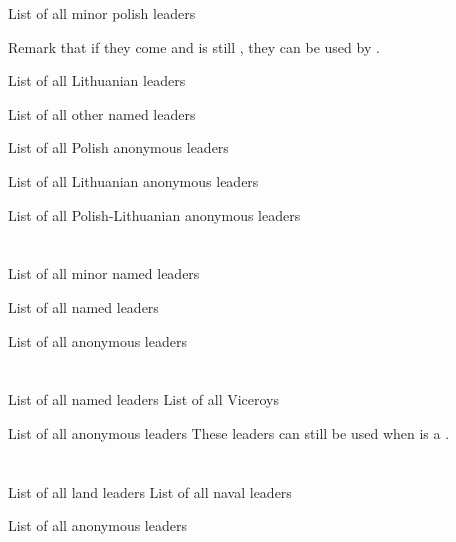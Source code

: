 \aparag List of all minor polish leaders 

\bparag Remark that if they come and \paysPologne is still \MAJ, they can be
used by \POL.

\aparag List of all Lithuanian leaders 

\aparag List of all other named leaders 

\aparag List of all Polish anonymous leaders \listanonymepologne

\aparag List of all Lithuanian anonymous leaders \listanonymelithuanie

\aparag List of all Polish-Lithuanian anonymous leaders \listanonymepollit




\section{\paysmajeurPrusse}

\aparag List of all minor named leaders 

\aparag List of all named leaders 

\aparag List of all anonymous leaders \listanonymeprusseM




\section{\paysmajeurPortugal}

\aparag List of all named leaders 
\aparag List of all Viceroys 

\aparag List of all anonymous leaders
\bparag These leaders can still be used when \paysPortugal is a \MIN.
\listanonymeportugal




\section{\paysmajeurRussie}

\aparag List of all land leaders 
\aparag List of all naval leaders 

\aparag List of all anonymous leaders \listanonymerussie




\section{\paysmajeurSuede}


